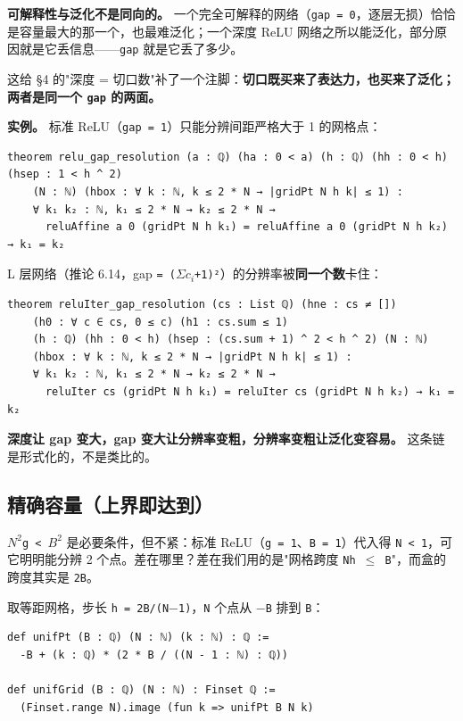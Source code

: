 \documentclass[11pt,a4paper]{ctexart}
\begin{document}
\textbf{可解释性与泛化不是同向的。} 一个完全可解释的网络（\texttt{gap = 0}，逐层无损）恰恰是容量最大的那一个，也最难泛化；一个深度 ReLU 网络之所以能泛化，部分原因就是它丢信息——\texttt{gap} 就是它丢了多少。

这给 §4 的"深度 = 切口数"补了一个注脚：\textbf{切口既买来了表达力，也买来了泛化；两者是同一个 \texttt{gap} 的两面。}

\textbf{实例。} 标准 ReLU（\texttt{gap = 1}）只能分辨间距严格大于 1 的网格点：

\begin{lstlisting}
theorem relu_gap_resolution (a : ℚ) (ha : 0 < a) (h : ℚ) (hh : 0 < h) (hsep : 1 < h ^ 2)
    (N : ℕ) (hbox : ∀ k : ℕ, k ≤ 2 * N → |gridPt N h k| ≤ 1) :
    ∀ k₁ k₂ : ℕ, k₁ ≤ 2 * N → k₂ ≤ 2 * N →
      reluAffine a 0 (gridPt N h k₁) = reluAffine a 0 (gridPt N h k₂) → k₁ = k₂
\end{lstlisting}

L 层网络（推论 6.14，gap \texttt{= (\ensuremath{\Sigma}\ensuremath{c_{i}}+1)²}）的分辨率被\textbf{同一个数}卡住：

\begin{lstlisting}
theorem reluIter_gap_resolution (cs : List ℚ) (hne : cs ≠ [])
    (h0 : ∀ c ∈ cs, 0 ≤ c) (h1 : cs.sum ≤ 1)
    (h : ℚ) (hh : 0 < h) (hsep : (cs.sum + 1) ^ 2 < h ^ 2) (N : ℕ)
    (hbox : ∀ k : ℕ, k ≤ 2 * N → |gridPt N h k| ≤ 1) :
    ∀ k₁ k₂ : ℕ, k₁ ≤ 2 * N → k₂ ≤ 2 * N →
      reluIter cs (gridPt N h k₁) = reluIter cs (gridPt N h k₂) → k₁ = k₂
\end{lstlisting}

\textbf{深度让 gap 变大，gap 变大让分辨率变粗，分辨率变粗让泛化变容易。} 这条链是形式化的，不是类比的。

\subsection{精确容量（上界即达到）}

\texttt{\ensuremath{N^{2}}g < \ensuremath{B^{2}}} 是必要条件，但不紧：标准 ReLU（\texttt{g = 1}、\texttt{B = 1}）代入得 \texttt{N < 1}，可它明明能分辨 2 个点。差在哪里？差在我们用的是"网格跨度 \texttt{Nh \ensuremath{\le} B}"，而盒的跨度其实是 \texttt{2B}。

取等距网格，步长 \texttt{h = 2B/(N\ensuremath{-}1)}，\texttt{N} 个点从 \texttt{\ensuremath{-}B} 排到 \texttt{B}：

\begin{lstlisting}
def unifPt (B : ℚ) (N : ℕ) (k : ℕ) : ℚ :=
  -B + (k : ℚ) * (2 * B / ((N - 1 : ℕ) : ℚ))

def unifGrid (B : ℚ) (N : ℕ) : Finset ℚ :=
  (Finset.range N).image (fun k => unifPt B N k)
\end{lstlisting}
\end{document}
